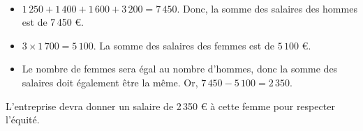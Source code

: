 \begin{corrige}
\ \\ [-5mm]
\begin{itemize}
   \item $1\,250+1\,400+1\,600+3\,200 =7\,450$. Donc, la somme des salaires des hommes est de 7\,450 \euro.
   \item $3\times1\,700 =5\,100$. La somme des salaires des femmes est de $5\,100$ \euro.
   \item Le nombre de femmes sera égal au nombre d'hommes, donc la somme des salaires doit également être la même. Or, $7\,450-5\,100 =2\,350$.
\end{itemize}
   {\blue L'entreprise devra donner un salaire de 2\,350 \euro{} à cette femme pour respecter l'équité.} \\
\end{corrige}

\bigskip


